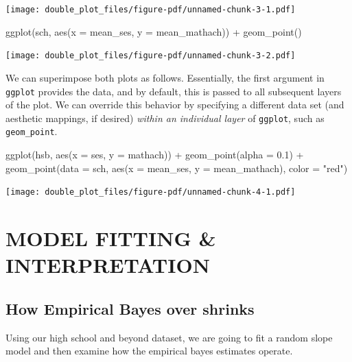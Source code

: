 \documentclass[
  letterpaper,
  DIV=11,
  numbers=noendperiod]{scrreprt}
\newenvironment{Shaded}{}{}
\newcommand{\AttributeTok}[1]{\textcolor[rgb]{0.49,0.56,0.16}{#1}}
\newcommand{\FloatTok}[1]{\textcolor[rgb]{0.25,0.63,0.44}{#1}}
\newcommand{\FunctionTok}[1]{\textcolor[rgb]{0.02,0.16,0.49}{#1}}
\newcommand{\NormalTok}[1]{#1}
\newcommand{\SpecialCharTok}[1]{\textcolor[rgb]{0.25,0.44,0.63}{#1}}
\newcommand{\StringTok}[1]{\textcolor[rgb]{0.25,0.44,0.63}{#1}}
\begin{document}
\texttt{[image: double\_plot\_files/figure-pdf/unnamed-chunk-3-1.pdf]}

\begin{Shaded}
\begin{Highlighting}[]
\FunctionTok{ggplot}\NormalTok{(sch, }\FunctionTok{aes}\NormalTok{(}\AttributeTok{x =}\NormalTok{ mean\_ses, }\AttributeTok{y =}\NormalTok{ mean\_mathach)) }\SpecialCharTok{+}
  \FunctionTok{geom\_point}\NormalTok{()}
\end{Highlighting}
\end{Shaded}

\texttt{[image: double\_plot\_files/figure-pdf/unnamed-chunk-3-2.pdf]}

We can superimpose both plots as follows. Essentially, the first
argument in \texttt{ggplot} provides the data, and by default, this is
passed to all subsequent layers of the plot. We can override this
behavior by specifying a different data set (and aesthetic mappings, if
desired) \emph{within an individual layer} of \texttt{ggplot}, such as
\texttt{geom\_point}.

\begin{Shaded}
\begin{Highlighting}[]
\FunctionTok{ggplot}\NormalTok{(hsb, }\FunctionTok{aes}\NormalTok{(}\AttributeTok{x =}\NormalTok{ ses, }\AttributeTok{y =}\NormalTok{ mathach)) }\SpecialCharTok{+}
  \FunctionTok{geom\_point}\NormalTok{(}\AttributeTok{alpha =} \FloatTok{0.1}\NormalTok{) }\SpecialCharTok{+}
  \FunctionTok{geom\_point}\NormalTok{(}\AttributeTok{data =}\NormalTok{ sch, }\FunctionTok{aes}\NormalTok{(}\AttributeTok{x =}\NormalTok{ mean\_ses, }\AttributeTok{y =}\NormalTok{ mean\_mathach), }\AttributeTok{color =} \StringTok{"red"}\NormalTok{)}
\end{Highlighting}
\end{Shaded}

\texttt{[image: double\_plot\_files/figure-pdf/unnamed-chunk-4-1.pdf]}

\part{MODEL FITTING \& INTERPRETATION}

\chapter{How Empirical Bayes over
shrinks}\label{how-empirical-bayes-over-shrinks}

Using our high school and beyond dataset, we are going to fit a random
slope model and then examine how the empirical bayes estimates operate.
\end{document}
